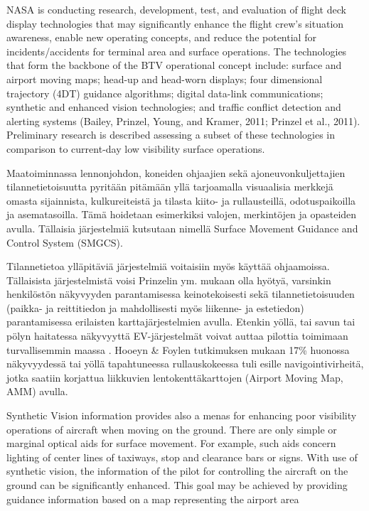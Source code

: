 \documentclass[utf8,bachelor,manualbib]{gradu3}
\begin{document}
NASA is conducting research, development, test, and evaluation of flight deck display technologies that may significantly enhance the flight crew's situation awareness, enable new operating concepts, and reduce the potential for incidents/accidents for terminal area and surface operations. The technologies that form the backbone of the BTV operational concept include: surface and airport moving maps; head-up and head-worn displays; four dimensional trajectory (4DT) guidance algorithms; digital data-link communications; synthetic and enhanced vision technologies; and traffic conflict detection and alerting systems (Bailey, Prinzel, Young, and Kramer, 2011; Prinzel et al., 2011). Preliminary research is described assessing a subset of these technologies in comparison to current-day low visibility surface operations. \citep{prinzel2013}

Maatoiminnassa lennonjohdon, koneiden ohjaajien sekä ajoneuvonkuljettajien tilannetietoisuutta pyritään pitämään yllä tarjoamalla visuaalisia merkkejä omasta sijainnista, kulkureiteistä ja tilasta kiito- ja rullausteillä, odotuspaikoilla ja asematasoilla. Tämä hoidetaan esimerkiksi valojen, merkintöjen ja opasteiden avulla. Tällaisia järjestelmiä kutsutaan nimellä Surface Movement Guidance and Control System (SMGCS). \citep{prinzel2013}

Tilannetietoa ylläpitäviä järjestelmiä voitaisiin myös käyttää ohjaamoissa. Tällaisista järjestelmistä voisi Prinzelin ym. \citeyearpar{prinzel2013} mukaan olla hyötyä, varsinkin henkilöstön näkyvyyden parantamisessa keinotekoisesti sekä tilannetietoisuuden (paikka- ja reittitiedon ja mahdollisesti myös liikenne- ja estetiedon) parantamisessa erilaisten karttajärjestelmien avulla. Etenkin yöllä, tai savun tai pölyn haitatessa näkyvyyttä EV-järjestelmät voivat auttaa pilottia toimimaan turvallisemmin maassa \citep{prinzel2013}. Hooeyn \& Foylen \citeyearpar{hooey2007} tutkimuksen mukaan 17\% huonossa näkyvyydessä tai yöllä tapahtuneessa rullauskokeessa tuli esille navigointivirheitä, jotka saatiin korjattua liikkuvien lentokenttäkarttojen (Airport Moving Map, AMM) avulla.

Synthetic Vision information provides also a menas for enhancing poor visibility operations of aircraft when moving on the ground. There are only simple or marginal optical aids for surface movement.
For example, such aids concern lighting of center lines of
taxiways, stop and clearance bars or signs.
With use of synthetic vision, the information of the pilot for
controlling the aircraft on the ground can be significantly
enhanced. This goal may be achieved by providing guidance
information based on a map representing the airport area \citep{mollersachs1994} 
\end{document}
